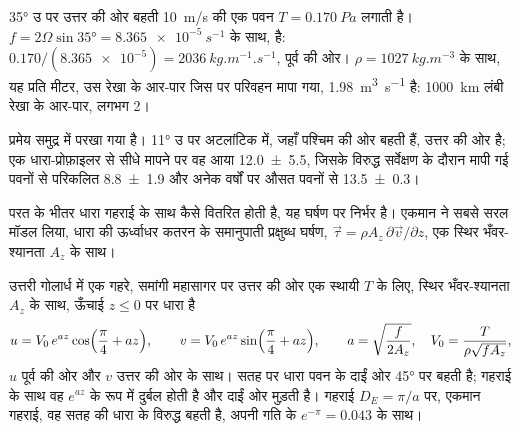 \begin{example}[एक ताज़ी हवा के नीचे परिवहन]\label{ex:b1:ocean-circulation:transport}
\ang{35} उ पर उत्तर की ओर बहती \qty{10}{m/s} की एक पवन
$T = \qty{0.170}{Pa}$ लगाती है। $f = 2\Omega\sin\ang{35} = \qty{8.365e-5}{s^{-1}}$ के साथ,  है: $0.170/(\num{8.365e-5}) = \qty{2036}{kg.m^{-1}.s^{-1}}$, पूर्व की ओर। $\rho = \qty{1027}{kg.m^{-3}}$ के साथ, यह प्रति मीटर, उस रेखा के आर-पार जिस पर परिवहन मापा गया, \qty{1.98}{m^3.s^{-1}} है: \qty{1000}{km} लंबी रेखा के आर-पार, लगभग \qty{2}{\sverdrup}।
\end{example}

प्रमेय समुद्र में परखा गया है। \ang{11} उ पर अटलांटिक में, जहाँ  पश्चिम की ओर बहती हैं,  उत्तर की ओर है; एक धारा-प्रोफ़ाइलर से सीधे मापने पर वह आया
\qty[uncertainty-mode=separate]{12.0 \pm 5.5}{\sverdrup}, जिसके विरुद्ध सर्वेक्षण के दौरान मापी गई पवनों से परिकलित \qty[uncertainty-mode=separate]{8.8 \pm 1.9}{\sverdrup} और अनेक वर्षों पर औसत पवनों से \qty[uncertainty-mode=separate]{13.5 \pm 0.3}{\sverdrup}।

परत के भीतर धारा गहराई के साथ कैसे वितरित होती है, यह घर्षण पर निर्भर है। एकमान ने सबसे सरल मॉडल लिया, धारा की ऊर्ध्वाधर कतरन के समानुपाती प्रक्षुब्ध घर्षण,
$\vec\tau = \rho A_z\,\partial\vec v/\partial z$, एक स्थिर भँवर-श्यानता $A_z$ के साथ।

\begin{proposition}[एकमान सर्पिल]\label{prop:b1:ocean-circulation:spiral}
उत्तरी गोलार्ध में एक गहरे, समांगी महासागर पर उत्तर की ओर एक स्थायी  $T$ के लिए,
स्थिर भँवर-श्यानता $A_z$ के साथ, ऊँचाई $z
\leq 0$ पर धारा है
\[
  u = V_0\,e^{az}\cos\Bigl(\frac\pi4 + az\Bigr),\qquad
  v = V_0\,e^{az}\sin\Bigl(\frac\pi4 + az\Bigr),\qquad
  a = \sqrt{\frac{f}{2A_z}},\quad V_0 = \frac{T}{\rho\sqrt{fA_z}},
\]
$u$ पूर्व की ओर और $v$ उत्तर की ओर के साथ। सतह पर धारा पवन के दाईं ओर \ang{45} पर बहती है; गहराई के साथ वह $e^{az}$ के रूप में दुर्बल होती है और दाईं ओर मुड़ती है। गहराई $D_E = \pi/a$ पर, एकमान गहराई, वह सतह की धारा के विरुद्ध बहती है, अपनी गति के $e^{-\pi} = \num{0.043}$ के साथ।
\end{proposition}
\admitted

